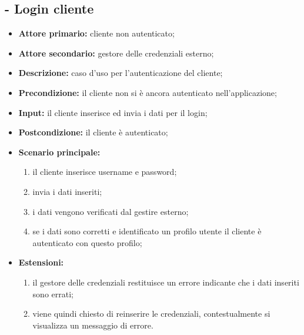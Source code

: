 \subsection{ - Login cliente}
\begin{itemize}
    \item \textbf{Attore primario:} cliente non autenticato;
    \item \textbf{Attore secondario:} gestore delle credenziali esterno;
    \item \textbf{Descrizione:} caso d'uso per l'autenticazione del cliente;
    \item \textbf{Precondizione:} il cliente non si è ancora autenticato nell'applicazione;
    \item \textbf{Input:} il cliente inserisce ed invia i dati per il login;
    \item \textbf{Postcondizione:} il cliente è autenticato;
    \item \textbf{Scenario principale:}
          \begin{enumerate}
              \item il cliente inserisce username e password;
              \item invia i dati inseriti;
              \item i dati vengono verificati dal gestire esterno;
              \item se i dati sono corretti e identificato un profilo utente il cliente è autenticato con questo profilo;
          \end{enumerate}
    \item \textbf{Estensioni:}
          \begin{enumerate}
              \item il gestore delle credenziali restituisce un errore indicante che i dati inseriti sono errati;
              \item viene quindi chiesto di reinserire le credenziali, contestualmente si visualizza un messaggio di errore.
          \end{enumerate}
\end{itemize}

\stepUserCase
